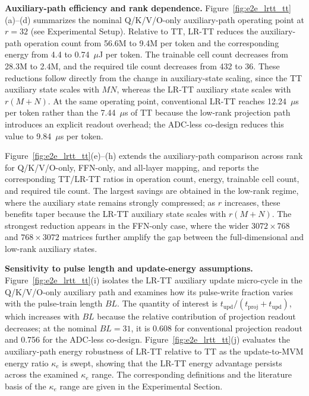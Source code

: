 \documentclass[AMA,LATO2COL]{WileyNJDv5}
\begin{document}
\noindent\textbf{Auxiliary-path efficiency and rank dependence.}
Figure~\ref{fig:e2e_lrtt_tt}(a)--(d) summarizes the nominal Q/K/V/O-only auxiliary-path operating point at \(r=32\) (see Experimental Setup). Relative to TT, LR-TT reduces the auxiliary-path operation count from 56.6M to 9.4M per token and the corresponding energy from 4.4 to 0.74~\(\mu\)J per token. The trainable cell count decreases from 28.3M to 2.4M, and the required tile count decreases from 432 to 36. These reductions follow directly from the change in auxiliary-state scaling, since the TT auxiliary state scales with \(MN\), whereas the LR-TT auxiliary state scales with \(r(M+N)\). At the same operating point, conventional LR-TT reaches 12.24~\(\mu\)s per token rather than the 7.44~\(\mu\)s of TT because the low-rank projection path introduces an explicit readout overhead; the ADC-less co-design reduces this value to 9.84~\(\mu\)s per token.

\noindent
Figure~\ref{fig:e2e_lrtt_tt}(e)--(h) extends the auxiliary-path comparison across rank for Q/K/V/O-only, FFN-only, and all-layer mapping, and reports the corresponding TT/LR-TT ratios in operation count, energy, trainable cell count, and required tile count. The largest savings are obtained in the low-rank regime, where the auxiliary state remains strongly compressed; as \(r\) increases, these benefits taper because the LR-TT auxiliary state scales with \(r(M+N)\). The strongest reduction appears in the FFN-only case, where the wider \(3072\times768\) and \(768\times3072\) matrices further amplify the gap between the full-dimensional and low-rank auxiliary states.

\noindent\textbf{Sensitivity to pulse length and update-energy assumptions.}
Figure~\ref{fig:e2e_lrtt_tt}(i) isolates the LR-TT auxiliary update micro-cycle in the Q/K/V/O-only auxiliary path and examines how its pulse-write fraction varies with the pulse-train length \(BL\). The quantity of interest is \(t_{\mathrm{upd}}/(t_{\mathrm{proj}}+t_{\mathrm{upd}})\), which increases with \(BL\) because the relative contribution of projection readout decreases; at the nominal \(BL=31\), it is 0.608 for conventional projection readout and 0.756 for the ADC-less co-design. Figure~\ref{fig:e2e_lrtt_tt}(j) evaluates the auxiliary-path energy robustness of LR-TT relative to TT as the update-to-MVM energy ratio \(\kappa_e\) is swept, showing that the LR-TT energy advantage persists across the examined \(\kappa_e\) range. The corresponding definitions and the literature basis of the \(\kappa_e\) range are given in the Experimental Section.
\end{document}
